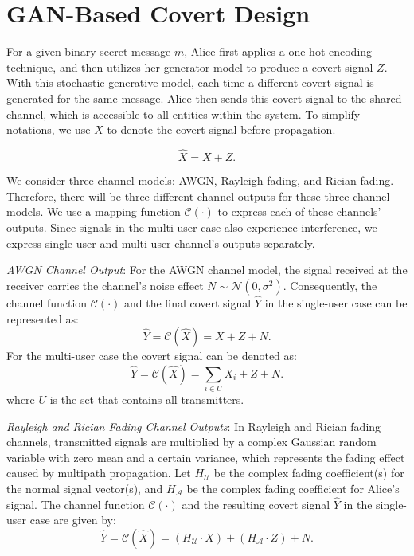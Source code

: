 \section{GAN-Based Covert Design}
\label{s:gan_covert}
For a given binary secret message \(m\), Alice first applies a one-hot encoding technique, and then utilizes her generator model to produce a covert signal \(Z\). With this stochastic generative model, each time a different covert signal is generated for the same message. Alice then sends this covert signal to the shared channel, which is accessible to all entities within the system. To simplify notations, we use \(\hat{X}\) to denote the covert signal before propagation.

\begin{equation}
	\hat{X} = X + Z.
\end{equation}

We consider three channel models: AWGN, Rayleigh fading, and Rician fading. Therefore, there will be three different channel outputs for these three channel models. We use a mapping function \(\mathcal{C}(\cdot)\) to express each of these channels' outputs. Since signals in the multi-user case also experience interference, we express single-user and multi-user channel's outputs separately.

\textit{AWGN Channel Output}: For the AWGN channel model, the signal received at the receiver carries the channel's noise effect \(N \sim \mathcal{N}(0, \sigma^2)\). Consequently, the channel function \(\mathcal{C}(\cdot)\) and the final covert signal \(\hat{Y}\) in the single-user case can be represented as:
\begin{equation}
	\hat{Y} = \mathcal{C}(\hat{X}) = X + Z + N.
\end{equation}
For the multi-user case the covert signal can be denoted as:
\begin{equation}
	\hat{Y} = \mathcal{C}(\hat{X}) = \sum_{i \in U}X_i + Z + N.
\end{equation}
where \(U\) is the set that contains all transmitters.

\textit{Rayleigh and Rician Fading Channel Outputs}: In Rayleigh and Rician fading channels, transmitted signals are multiplied by a complex Gaussian random variable with zero mean and a certain variance, which represents the fading effect caused by multipath propagation. Let \(H_{\mathcal{U}}\) be the complex fading coefficient(s) for the normal signal vector(s), and \(H_{\mathcal{A}}\) be the complex fading coefficient for Alice's signal. The channel function \(\mathcal{C}(\cdot)\) and the resulting covert signal \(\hat{Y}\) in the single-user case are given by:
\begin{equation}
	\hat{Y} = \mathcal{C}(\hat{X}) = (H_{\mathcal{U}} \cdot X) + (H_{\mathcal{A}} \cdot Z) + N.
\end{equation}


